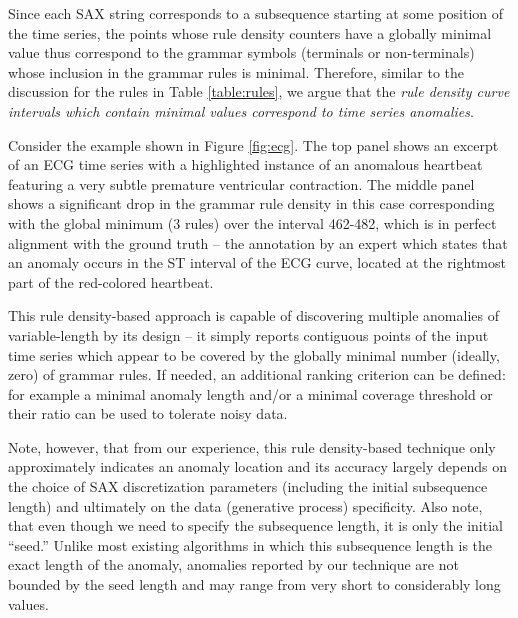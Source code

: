 \documentclass{llncs}
\begin{document}
Since each SAX string corresponds to a subsequence starting at some position of the time series, the points whose rule density counters have a globally minimal value thus correspond to the grammar symbols (terminals or non-terminals) whose inclusion in the grammar rules is minimal. Therefore, similar to the discussion for the rules in Table \ref{table:rules}, we argue that the \textit{rule density curve intervals which contain minimal values correspond to time series anomalies}. 


Consider the example shown in Figure \ref{fig:ecg}. The top panel shows an excerpt of an ECG time series with a highlighted instance of an anomalous heartbeat featuring a very subtle premature ventricular contraction. The middle panel shows a significant drop in the grammar rule density in this case corresponding with the global minimum (3 rules) over the interval 462-482, which is in perfect alignment with the ground truth -- the annotation by an expert which states that an anomaly occurs in the ST interval of the ECG curve, located at the rightmost part of the red-colored heartbeat.  

This rule density-based approach is capable of discovering multiple anomalies of variable-length by its design -- it simply reports contiguous points of the input time series which appear to be covered by the globally minimal number (ideally, zero) of grammar rules. If needed, an additional ranking criterion can be defined: for example a minimal anomaly length and/or a minimal coverage threshold or their ratio can be used to tolerate noisy data.

Note, however, that from our experience, this rule density-based technique only approximately indicates an anomaly location and its accuracy largely depends on the choice of SAX discretization parameters (including the initial subsequence length) and ultimately on the data (generative process) specificity. Also note, that even though we need to specify the subsequence length, it is only the initial ``seed.'' Unlike most existing algorithms in which this subsequence length is the exact length of the anomaly, anomalies reported by our technique are not bounded by the seed length and may range from very short to considerably long values.
\enlargethispage{\baselineskip}
\end{document}
